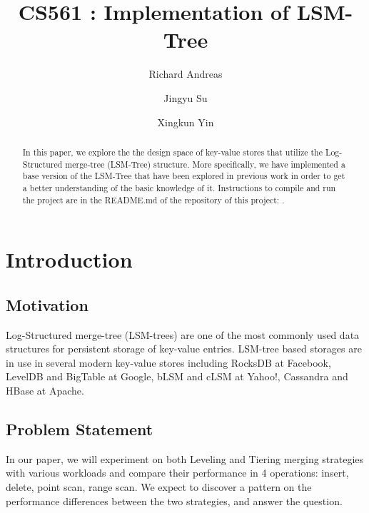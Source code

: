 \documentclass[sigconf]{acmart}
\begin{document}
    \title{CS561 : Implementation of LSM-Tree}

    \author{Richard Andreas}
    \author{Jingyu Su}
    \author{Xingkun Yin}

    \begin{abstract}
        In this paper, we explore the the design space of key-value stores that utilize the Log-Structured merge-tree (LSM-Tree) structure. More specifically, we have implemented a base version of the LSM-Tree that have been explored in previous work in order to get a better understanding of the basic knowledge of it. Instructions to compile and run the project are in the README.md of the repository of this project: \href{https://github.com/randreas/LSM_Tree_Repo}{\color{blue}{LSM Tree}}.
    \end{abstract}

    \maketitle

    \section{Introduction}

    \subsection{Motivation}


    Log-Structured merge-tree (LSM-trees) are one of the most commonly used data structures for persistent storage of key-value entries. LSM-tree based storages are in use in several modern key-value stores including RocksDB at
    Facebook, LevelDB and BigTable at Google, bLSM and cLSM at Yahoo!, Cassandra
    and HBase at Apache.


    \subsection{Problem Statement}
     In our paper, we will experiment on both Leveling and Tiering merging strategies with various workloads and compare their performance in 4 operations: insert, delete, point scan, range scan. We expect to discover a pattern on the performance differences between the two strategies, and answer the question.
\end{document}
